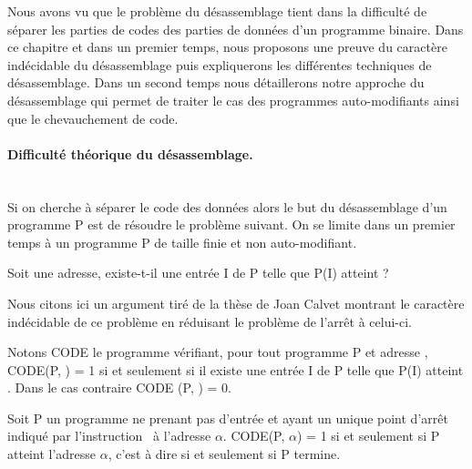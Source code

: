 Nous avons vu que le problème du désassemblage tient dans la difficulté de séparer les parties de codes des parties de données d'un programme binaire.
Dans ce chapitre et dans un premier temps, nous proposons une preuve du caractère indécidable du désassemblage puis expliquerons les différentes techniques de désassemblage. Dans un second temps nous détaillerons notre approche du désassemblage qui permet de traiter le cas des programmes auto-modifiants ainsi que le chevauchement de code.


\paragraph{Difficulté théorique du désassemblage.}
~\\
Si on cherche à séparer le code des données alors le but du désassemblage d'un programme P est de résoudre le problème suivant. On se limite dans un premier temps à un programme P de taille finie et non auto-modifiant.
\begin{pb}
Soit  une adresse, existe-t-il une entrée I de P telle que P(I) atteint  ?
\end{pb}

Nous citons ici un argument tiré de la thèse de Joan Calvet \cite{Calvet2013} montrant le caractère indécidable de ce problème en réduisant le problème de l'arrêt à celui-ci.

Notons CODE le programme vérifiant, pour tout programme P et adresse , CODE(P, ) = 1 si et seulement si il existe une entrée I de P telle que P(I) atteint . Dans le cas contraire CODE (P, ) = 0.

Soit P un programme ne prenant pas d'entrée et ayant un unique point d'arrêt indiqué par l'instruction \halt\ à l'adresse $\alpha$.
CODE(P, $\alpha$) = 1 si et seulement si P atteint l'adresse $\alpha$, c'est à dire si et seulement si P termine.

